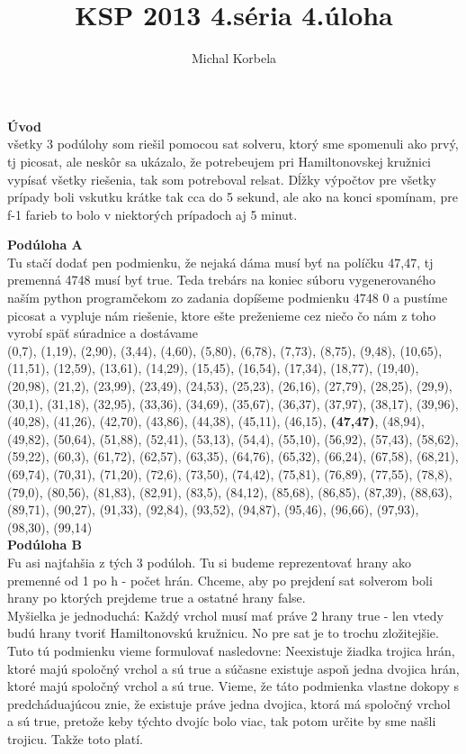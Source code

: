\documentclass[a4paper,11pt]{article}
\title{KSP 2013 4.séria 4.úloha}
\author{Michal Korbela}
\begin{document}
\textbf{Úvod}\\
všetky 3 podúlohy som riešil pomocou sat solveru, ktorý sme spomenuli ako prvý, tj picosat, ale neskôr sa ukázalo, že potrebeujem pri Hamiltonovskej kružnici vypísať všetky riešenia, tak som potreboval relsat. Dĺžky výpočtov pre všetky prípady boli vskutku krátke tak cca do 5 sekund, ale ako na konci spomínam, pre f-1 farieb to bolo v niektorých prípadoch aj 5 minut.

\textbf{Podúloha A}\\

Tu stačí dodať pen podmienku, že nejaká dáma musí byť na políčku 47,47, tj premenná 4748 musí byť true. Teda trebárs na koniec súboru vygenerovaného naším python programčekom zo zadania dopíšeme podmienku 4748 0 a pustíme picosat a vypluje nám riešenie, ktore ešte preženieme cez niečo čo nám z toho vyrobí späť súradnice a dostávame\\


(0,7), (1,19), (2,90), (3,44), (4,60), (5,80), (6,78), (7,73), (8,75), (9,48), (10,65), (11,51), (12,59), (13,61), (14,29), (15,45), (16,54), (17,34), (18,77), (19,40), (20,98), (21,2), (23,99), (23,49), (24,53), (25,23), (26,16), (27,79), (28,25), (29,9), (30,1), (31,18), (32,95), (33,36), (34,69), (35,67), (36,37), (37,97), (38,17), (39,96), (40,28), (41,26), (42,70), (43,86), (44,38), (45,11), (46,15), \textbf{(47,47)}, (48,94), (49,82), (50,64), (51,88), (52,41), (53,13), (54,4), (55,10), (56,92), (57,43), (58,62), (59,22), (60,3), (61,72), (62,57), (63,35), (64,76), (65,32), (66,24), (67,58), (68,21), (69,74), (70,31), (71,20), (72,6), (73,50), (74,42), (75,81), (76,89), (77,55), (78,8), (79,0), (80,56), (81,83), (82,91), (83,5), (84,12), (85,68), (86,85), (87,39), (88,63), (89,71), (90,27), (91,33), (92,84), (93,52), (94,87), (95,46), (96,66), (97,93), (98,30), (99,14)
\\

\textbf{Podúloha B}\\

Fu asi najťahšia z tých 3 podúloh.
Tu si budeme reprezentovať hrany ako premenné od 1 po h - počet hrán. Chceme, aby po prejdení sat solverom boli hrany po ktorých prejdeme true a ostatné hrany false.\\
 
Myšielka je jednoduchá: Každý vrchol musí mať práve 2 hrany true - len vtedy budú hrany tvoriť Hamiltonovskú kružnicu. No pre sat je to trochu zložitejšie. Tuto tú podmienku vieme formulovať nasledovne: Neexistuje žiadka trojica hrán, ktoré majú spoločný vrchol a sú true a súčasne existuje aspoň jedna dvojica hrán, ktoré majú spoločný vrchol a sú true. Vieme, že táto podmienka vlastne dokopy s predcháduajúcou znie, že existuje práve jedna dvojica, ktorá má spoločný vrchol a sú true, pretože keby týchto dvojíc bolo viac, tak potom určite by sme našli trojicu. Takže toto platí. 
\\
\end{document}
